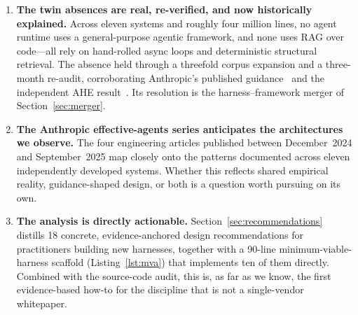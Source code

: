 \documentclass[11pt,a4paper]{article}
\begin{document}
\begin{enumerate}[itemsep=2pt]
  \item \textbf{The twin absences are real, re-verified, and now historically explained.} Across eleven systems and roughly four million lines, no agent runtime uses a general-purpose agentic framework, and none uses RAG over code---all rely on hand-rolled async loops and deterministic structural retrieval. The absence held through a threefold corpus expansion and a three-month re-audit, corroborating Anthropic's published guidance~\cite{schluntz2024agents,rajasekaran2025context} and the independent AHE result~\cite{lin2026ahe}. Its resolution is the harness--framework merger of Section~\ref{sec:merger}.

  \item \textbf{The Anthropic effective-agents series anticipates the architectures we observe.} The four engineering articles published between December~2024 and September~2025 map closely onto the patterns documented across eleven independently developed systems. Whether this reflects shared empirical reality, guidance-shaped design, or both is a question worth pursuing on its own.

  \item \textbf{The analysis is directly actionable.} Section~\ref{sec:recommendations} distills 18 concrete, evidence-anchored design recommendations for practitioners building new harnesses, together with a 90-line minimum-viable-harness scaffold (Listing~\ref{lst:mva}) that implements ten of them directly. Combined with the source-code audit, this is, as far as we know, the first evidence-based how-to for the discipline that is not a single-vendor whitepaper.


\end{enumerate}
\end{document}
